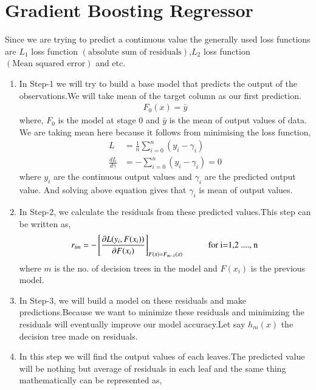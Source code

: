 \documentclass[journal,12pt,onecolumn]{IEEEtran}
\providecommand{\brak}[1]{\ensuremath{\left(#1\right)}}
\theoremstyle{remark}
\numberwithin{equation}{section}
\begin{document}
		\section{Gradient Boosting Regressor}
		  Since we are trying to predict a continuous value the generally used loss functions are $L_{1}$ loss function $\brak{\text{absolute sum of residuals}}$,$L_{2}$ loss function$\brak{\text{Mean squared error}}$ and etc.
		  \begin{enumerate}
		   \item In Step-1 we will try to build a base model that predicts the output of the observations.We will take mean of the target column as our first prediction.
			   \begin{align}
				   F_{0}\brak{x} = \bar{y}
		           \end{align}
				  where, $F_{0}$ is the model at stage 0 and $\bar{y}$ is the mean of output values of data.
                   We are taking mean here because it follows from minimising the loss function,
			   \begin{align}
                              L &= \frac{1}{n} \sum_{i=0}^n(y_i-\gamma_i) \\
                             \frac{dL}{d\gamma} &= -\sum_{i=0}^n(y_i - \gamma_i) = 0 
                           \end{align}
				  where $y_i$ are the continuous output values and $\gamma_i$  are the predicted output value.
		And solving above equation gives that $\gamma_i$ is mean of output values.
		   \item In Step-2, we calculate the residuals from these predicted values.This step can be written as,
			    \begin{align}
                              r_{im} = - \left[\frac{\partial L(y_i,F(x_i))}{\partial F(x_i)}\right]_{F(x)=F_{m-1}(x)} \hspace{10mm} \text{for i=1,2 ...., n}
                            \end{align}
				 where $m$ is the no. of decision trees in the model and $F\brak{x_i}$ is the previous model.
		   \item In Step-3,  we will build a model on these residuals and make predictions.Because we want to minimize these residuals and minimizing the residuals will eventually improve our model accuracy.Let say $h_m(x)$ the decision tree made on residuals.
	           \item In this step we will find the output values of each leaves.The predicted value will be nothing but average of residuals in each leaf and the same thing mathematically can be represented as,

\end{enumerate}
\end{document}
